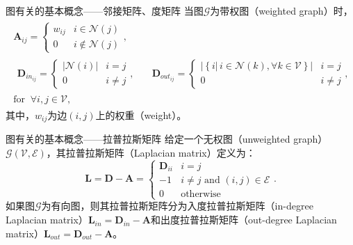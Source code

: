 \documentclass{beamer}
\begin{document}
\begin{frame}{图有关的基本概念——邻接矩阵、度矩阵}
	当图$\mathscr{G}$为带权图（weighted graph）时，
	\begin{equation}
		\begin{matrix}
			\begin{matrix}
				\textbf{A}_{ij}=\left\{
				\begin{matrix}
					w_{ij} & i\in\mathcal{N}\left(j\right) \\
					0 & i\notin\mathcal{N}\left(j\right)
				\end{matrix}\right.,
				\\
				\begin{matrix}
					\textbf{D}_{in_{ij}}=\left\{
					\begin{matrix}
						\left|\mathcal{N}\left(i\right)\right| & i=j
						\\
						0 & i\neq j
					\end{matrix}\right.,
					&
					\quad\textbf{D}_{out_{ij}}=\left\{
					\begin{matrix}
						\left|\left\{i|\,i\in\mathcal{N}\left(k\right),\forall k\in\mathscr{V}\right\}\right| & i=j
						\\
						0 & i\neq j
					\end{matrix}\right.,
				\end{matrix}
				\\
				\text{for}\;\;\forall i,j\in\mathscr{V},
			\end{matrix}&
		\end{matrix}
	\end{equation}
	其中，$w_{ij}$为边$\left(i,j\right)$上的权重（weight）。
\end{frame}

\begin{frame}{图有关的基本概念——拉普拉斯矩阵}
	给定一个无权图（unweighted graph）$\mathscr{G}\left(\mathscr{V},\mathscr{E}\right)$，其拉普拉斯矩阵（Laplacian matrix）定义为：
	\begin{equation}
		\textbf{L}=\textbf{D}-\textbf{A}=\left\{\begin{matrix}
			\textbf{D}_{ii} & i=j\\
			-1 & i\neq j\,\,\text{and}\,\,\left(i,j\right)\in\mathscr{E}\\
			0 & \text{otherwise}
		\end{matrix}\right..
	\end{equation}
	如果图$\mathscr{G}$为有向图，则其拉普拉斯矩阵分为入度拉普拉斯矩阵（in-degree Laplacian matrix）$\textbf{L}_{in}=\textbf{D}_{in}-\textbf{A}$和出度拉普拉斯矩阵（out-degree Laplacian matrix）$\textbf{L}_{out}=\textbf{D}_{out}-\textbf{A}$。
\end{frame}
\end{document}
